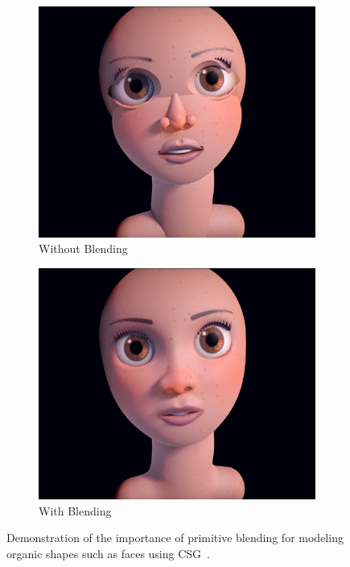 \begin{figure}[!b]
	\centering
	\begin{subfigure}[t]{0.45\textwidth}
		\centering
		\includegraphics[width=\textwidth]{Images/Face without blending}
		\caption{Without Blending}
	\end{subfigure}
	\hfill
	\begin{subfigure}[t]{0.45\textwidth}
		\centering
		\includegraphics[width=\textwidth]{Images/Face with blending}
		\caption{With Blending}
	\end{subfigure}
	\caption{Demonstration of the importance of primitive blending for modeling organic shapes such as faces using CSG~\cite{Quilez2013}.}
	\label{fig:primitive_blending}
\end{figure}

